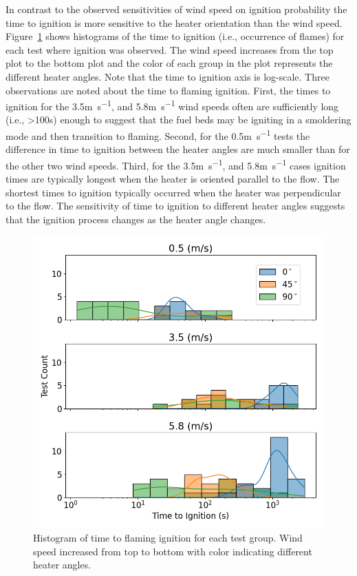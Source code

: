     In contrast to the observed sensitivities of wind speed on ignition probability the time to ignition is more sensitive to the heater orientation than the wind speed. Figure~\ref{fig:histogramFigure} shows histograms of the time to ignition (i.e., occurrence of flames) for each test where ignition was observed. The wind speed increases from the top plot to the bottom plot and the color of each group in the plot represents the different heater angles. Note that the time to ignition axis is log-scale. Three observations are noted about the time to flaming ignition. First, the times to ignition for the 3.5\si{\meter\per\second}, and 5.8\si{\meter\per\second} wind speeds often are sufficiently long (i.e., \textgreater 100\si{\second}) enough to suggest that the fuel beds may be igniting in a smoldering mode and then transition to flaming. Second, for the 0.5\si{\meter\per\second} tests the difference in time to ignition between the heater angles are much smaller than for the other two wind speeds. Third, for the 3.5\si{\meter\per\second}, and 5.8\si{\meter\per\second} cases ignition times are typically longest when the heater is oriented parallel to the flow. The shortest times to ignition typically occurred when the heater was perpendicular to the flow. The sensitivity of time to ignition to different heater angles suggests that the ignition process changes as the heater angle changes.
        \begin{figure}[hpbt]
            \centering
            \includegraphics[width=0.5\columnwidth]{Figures/stacked_speed_hist.png}
            \caption{Histogram of time to flaming ignition for each test group. Wind speed increased from top to bottom with color indicating different heater angles.}
            \label{fig:histogramFigure}
        \end{figure}
    

